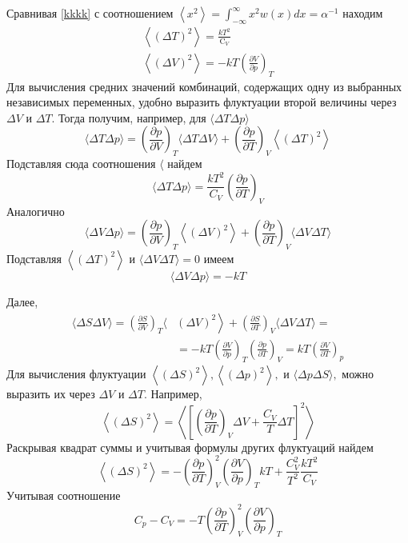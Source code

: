 \documentclass[a4paper,12pt]{article} %
\begin{document}
\begin{ttask}
Сравнивая \ref{kkkk} с соотношением $\left\langle x^{2}\right\rangle=\int_{-\infty}^{\infty} x^{2} w(x) d x=\alpha^{-1}$ 
находим
$$
\begin{array}{c}
\left\langle(\Delta T)^{2}\right\rangle=\frac{k T^{2}}{\mathrm{C}_{V}} \\
\left\langle(\Delta V)^{2}\right\rangle=-k T\left(\frac{\partial V}{\partial p}\right)_{T}
\end{array}
$$
Для вычисления средних значений комбинаций, содержащих одну из выбранных независимых переменных, удобно выразить флуктуации второй величины через $\Delta V$ и $\Delta T .$ Тогда получим, например, для $\langle\Delta T \Delta p\rangle$
$$
\langle\Delta T \Delta p\rangle=\left(\frac{\partial p}{\partial V}\right)_{T}\langle\Delta T \Delta V\rangle+\left(\frac{\partial p}{\partial T}\right)_{V}\left\langle(\Delta T)^{2}\right\rangle
$$
Подставляя сюда соотношения $\langle$ найдем
$$
\langle\Delta T \Delta p\rangle=\frac{k T^{2}}{C_{V}}\left(\frac{\partial p}{\partial T}\right)_{V}
$$
Аналогично
$$
\langle\Delta V \Delta p\rangle=\left(\frac{\partial p}{\partial V}\right)_{T}\left\langle(\Delta V)^{2}\right\rangle+\left(\frac{\partial p}{\partial T}\right)_{V}\langle\Delta V \Delta T\rangle
$$
Подставляя $ \left\langle(\Delta T)^{2}\right\rangle $ и $\langle\Delta V \Delta T\rangle=0$ имеем
$$
\langle\Delta V \Delta p\rangle=-k T
$$

Далее,
$$
\begin{aligned}
\langle\Delta S \Delta V\rangle=\left(\frac{\partial S}{\partial V}\right)_{T}\langle&\left.(\Delta V)^{2}\right\rangle+\left(\frac{\partial S}{\partial T}\right)_{V}\langle\Delta V \Delta T\rangle=\\
&=-k T\left(\frac{\partial V}{\partial p}\right)_{T}\left(\frac{\partial p}{\partial T}\right)_{V}=k T\left(\frac{\partial V}{\partial T}\right)_{p}
\end{aligned}
$$
Для вычисления флуктуации $\left\langle(\Delta S)^{2}\right\rangle,\left\langle(\Delta p)^{2}\right\rangle,$ и $\langle\Delta p \Delta S\rangle,$ можно
выразить их через $\Delta V$ и $\Delta T .$ Например,
$$
\left\langle(\Delta S)^{2}\right\rangle=\left\langle\left[\left(\frac{\partial p}{\partial T}\right)_{V} \Delta V+\frac{C_{V}}{T} \Delta T\right]^{2}\right\rangle
$$
Раскрывая квадрат суммы и учитывая формулы других флуктуаций найдем
$$
\left\langle(\Delta S)^{2}\right\rangle=-\left(\frac{\partial p}{\partial T}\right)_{V}^{2}\left(\frac{\partial V}{\partial p}\right)_{T} k T+\frac{C_{V}^{2}}{T^{2}} \frac{k T^{2}}{C_{V}}
$$
Учитывая соотношение
\begin{equation}\label{lll}
C_{p}-C_{V}=-T\left(\frac{\partial p}{\partial T}\right)_{V}^{2}\left(\frac{\partial V}{\partial p}\right)_{T}
\end{equation}


\end{ttask}
\end{document}
